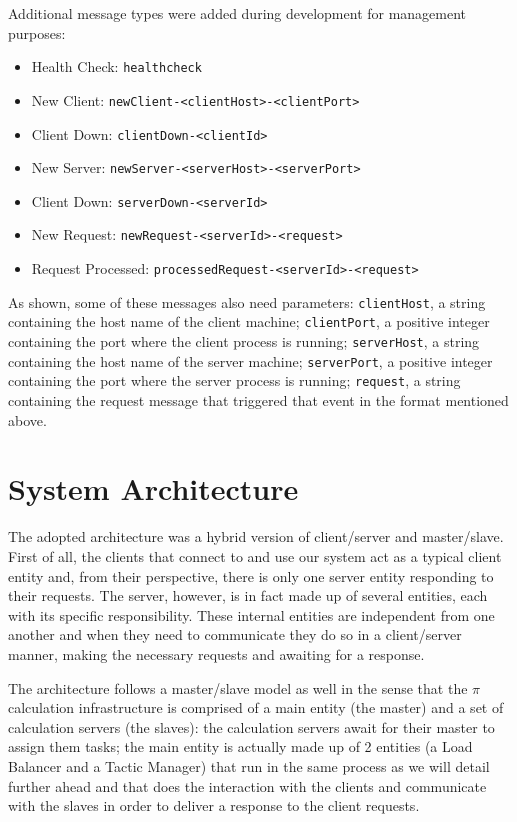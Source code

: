 \documentclass[12pt]{article}
\begin{document}
Additional message types were added during development for management purposes:
\vspace{-10pt}
\begin{itemize}[noitemsep]
  \item Health Check: \texttt{healthcheck}
  \item New Client: \texttt{newClient-<clientHost>-<clientPort>}
  \item Client Down: \texttt{clientDown-<clientId>}
  \item New Server: \texttt{newServer-<serverHost>-<serverPort>}
  \item Client Down: \texttt{serverDown-<serverId>}
  \item New Request: \texttt{newRequest-<serverId>-<request>}
  \item Request Processed: \texttt{processedRequest-<serverId>-<request>}
\end{itemize}
\vspace{-10pt}
As shown, some of these messages also need parameters:
\texttt{clientHost}, a string containing the host name of the client machine;
\texttt{clientPort}, a positive integer containing the port where the client process is running;
\texttt{serverHost}, a string containing the host name of the server machine;
\texttt{serverPort}, a positive integer containing the port where the server process is running;
\texttt{request}, a string containing the request message that triggered that event in the format mentioned above.

\newpage
\section{System Architecture} \label{architecture} %

The adopted architecture was a hybrid version of client/server and master/slave.
First of all, the clients that connect to and use our system act as a typical client entity and, from their perspective, there is only one server entity
responding to their requests.
The server, however, is in fact made up of several entities, each with its specific responsibility.
These internal entities are independent from one another and when they need to communicate they do so in a client/server manner, making the necessary requests
and awaiting for a response.

The architecture follows a master/slave model as well in the sense that the $\pi$ calculation infrastructure is comprised of a main entity (the master) and a
set of calculation servers (the slaves): the calculation servers await for their master to assign them tasks; the main entity is actually made up of 2
entities (a Load Balancer and a Tactic Manager) that run in the same process as we will detail further ahead and that does the interaction with the clients and
communicate with the slaves in order to deliver a response to the client requests.
\end{document}
